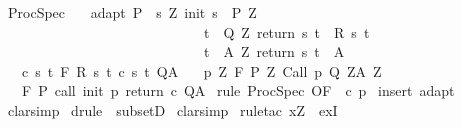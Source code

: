 \begin{isabellebody}
\ ProcSpec{\isacharprime}{\isacharcolon}\isanewline
\ \ \ adapt{\isacharcolon}\ {\isachardoublequoteopen}P\ {\isasymsubseteq}\ {\isacharbraceleft}s{\isachardot}\ {\isasymexists}Z{\isachardot}\ init\ s\ {\isasymin}\ P{\isacharprime}\ Z\ {\isasymand}\ \isanewline
\ \ \ \ \ \ \ \ \ \ \ \ \ \ \ \ \ \ \ \ \ \ \ \ \ \ \ \ \ {\isacharparenleft}{\isasymforall}t\ {\isasymin}\ Q{\isacharprime}\ Z{\isachardot}\ return\ s\ t\ {\isasymin}\ R\ s\ t{\isacharparenright}\ {\isasymand}\isanewline
\ \ \ \ \ \ \ \ \ \ \ \ \ \ \ \ \ \ \ \ \ \ \ \ \ \ \ \ \ {\isacharparenleft}{\isasymforall}t\ {\isasymin}\ A{\isacharprime}\ Z{\isachardot}\ return\ s\ t\ {\isasymin}\ A{\isacharparenright}{\isacharbraceright}{\isachardoublequoteclose}\isanewline
\ \ \ c{\isacharcolon}\ {\isachardoublequoteopen}{\isasymforall}s\ t{\isachardot}\ {\isasymGamma}{\isacharcomma}{\isasymTheta}{\isasymturnstile}\isactrlbsub {\isacharslash}F\isactrlesub \ {\isacharparenleft}R\ s\ t{\isacharparenright}\ {\isacharparenleft}c\ s\ t{\isacharparenright}\ Q{\isacharcomma}A{\isachardoublequoteclose}\isanewline
\ \ \ p{\isacharcolon}\ {\isachardoublequoteopen}{\isasymforall}Z{\isachardot}\ {\isasymGamma}{\isacharcomma}{\isasymTheta}{\isasymturnstile}\isactrlbsub {\isacharslash}F\isactrlesub \ {\isacharparenleft}P{\isacharprime}\ Z{\isacharparenright}\ Call\ p\ {\isacharparenleft}Q{\isacharprime}\ Z{\isacharparenright}{\isacharcomma}{\isacharparenleft}A{\isacharprime}\ Z{\isacharparenright}{\isachardoublequoteclose}\ \isanewline
\ \ \ {\isachardoublequoteopen}{\isasymGamma}{\isacharcomma}{\isasymTheta}{\isasymturnstile}\isactrlbsub {\isacharslash}F\isactrlesub \ P\ {\isacharparenleft}call\ init\ p\ return\ c{\isacharparenright}\ Q{\isacharcomma}A{\isachardoublequoteclose}\isanewline
%
\isadelimproof
%
\endisadelimproof
%
\isatagproof
{}\isamarkupfalse%
\ {\isacharparenleft}rule\ ProcSpec\ {\isacharbrackleft}OF\ {\isacharunderscore}\ c\ p{\isacharbrackright}{\isacharparenright}\isanewline
{}\isamarkupfalse%
\ {\isacharparenleft}insert\ adapt{\isacharparenright}\isanewline
{}\isamarkupfalse%
\ clarsimp\isanewline
{}\isamarkupfalse%
\ {\isacharparenleft}drule\ {\isacharparenleft}{}{\isacharparenright}\ subsetD{\isacharparenright}\isanewline
{}\isamarkupfalse%
\ {\isacharparenleft}clarsimp{\isacharparenright}\isanewline
{}\isamarkupfalse%
\ {\isacharparenleft}rule{\isacharunderscore}tac\ x{\isacharequal}Z\ \ exI{\isacharparenright}\isanewline

\end{isabellebody}
